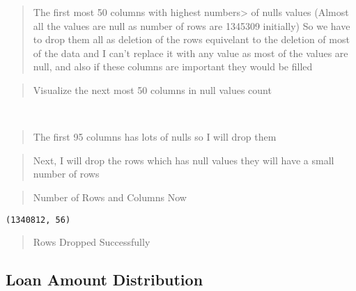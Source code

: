 \documentclass[11pt]{article}
\begin{document}
    \begin{quote}
The first most 50 columns with highest numbers\textgreater{} of nulls
values (Almost all the values are null as number of rows are 1345309
initially) So we have to drop them all as deletion of the rows
equivelant to the deletion of most of the data and I can't replace it
with any value as most of the values are null, and also if these columns
are important they would be filled
\end{quote}

    \begin{quote}
Visualize the next most 50 columns in null values count
\end{quote}

    \begin{center}
    \end{center}
    { \hspace*{\fill} \\}
    
    \begin{quote}
The first 95 columns has lots of nulls so I will drop them
\end{quote}

    \begin{quote}
Next, I will drop the rows which has null values they will have a small
number of rows
\end{quote}

    \begin{quote}
Number of Rows and Columns Now
\end{quote}

    \begin{Verbatim}[commandchars=\\\{\}]
(1340812, 56)
    \end{Verbatim}

    \begin{quote}
Rows Dropped Successfully
\end{quote}

    \hypertarget{loan-amount-distribution}{%
\subsection{Loan Amount Distribution}\label{loan-amount-distribution}}

    \begin{center}
    \end{center}
    { \hspace*{\fill} \\}
    
\end{document}
